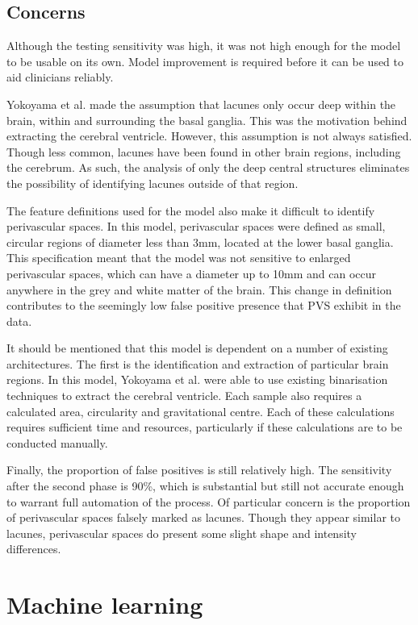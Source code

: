 \subsection*{Concerns}

Although the testing sensitivity was high, it was not high enough for the model to be usable on its own. Model improvement is required before it can be used to aid clinicians reliably.

Yokoyama et al. made the assumption that lacunes only occur deep within the brain, within and surrounding the basal ganglia. This was the motivation behind extracting the cerebral ventricle. However, this assumption is not always satisfied. Though less common, lacunes have been found in other brain regions, including the cerebrum. As such, the analysis of only the deep central structures eliminates the possibility of identifying lacunes outside of that region.

The feature definitions used for the model also make it difficult to identify perivascular spaces. In this model, perivascular spaces were defined as small, circular regions of diameter less than 3mm, located at the lower basal ganglia. This specification meant that the model was not sensitive to enlarged perivascular spaces, which can have a diameter up to 10mm and can occur anywhere in the grey and white matter of the brain. This change in definition contributes to the seemingly low false positive presence that PVS exhibit in the data.

It should be mentioned that this model is dependent on a number of existing architectures. The first is the identification and extraction of particular brain regions. In this model, Yokoyama et al. were able to use existing binarisation techniques to extract the cerebral ventricle. Each sample also requires a calculated area, circularity and gravitational centre. Each of these calculations requires sufficient time and resources, particularly if these calculations are to be conducted manually.

Finally, the proportion of false positives is still relatively high. The sensitivity after the second phase is 90\%, which is substantial but still not accurate enough to warrant full automation of the process. Of particular concern is the proportion of perivascular spaces falsely marked as lacunes. Though they appear similar to lacunes, perivascular spaces do present some slight shape and intensity differences.

\section{Machine learning}\label{litrev-ml}

